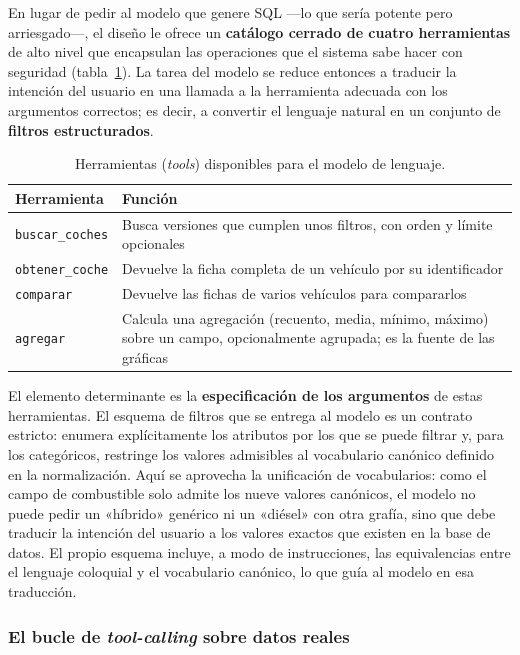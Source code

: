 En lugar de pedir al modelo que genere SQL —lo que sería potente pero
arriesgado—, el diseño le ofrece un \textbf{catálogo cerrado de cuatro
herramientas} de alto nivel que encapsulan las operaciones que el sistema sabe
hacer con seguridad (tabla~\ref{tab:tools}). La tarea del modelo se reduce
entonces a traducir la intención del usuario en una llamada a la herramienta
adecuada con los argumentos correctos; es decir, a convertir el lenguaje natural
en un conjunto de \textbf{filtros estructurados}.

\begin{table}[H]
\centering
\begin{tabular}{p{3.0cm}p{9.5cm}}
\hline
\textbf{Herramienta} & \textbf{Función} \\
\hline
\texttt{buscar\_coches} &
Busca versiones que cumplen unos filtros, con orden y límite opcionales \\
\texttt{obtener\_coche} &
Devuelve la ficha completa de un vehículo por su identificador \\
\texttt{comparar} &
Devuelve las fichas de varios vehículos para compararlos \\
\texttt{agregar} &
Calcula una agregación (recuento, media, mínimo, máximo) sobre un campo,
opcionalmente agrupada; es la fuente de las gráficas \\
\hline
\end{tabular}
\caption{Herramientas (\emph{tools}) disponibles para el modelo de lenguaje.}
\label{tab:tools}
\end{table}

El elemento determinante es la \textbf{especificación de los argumentos} de
estas herramientas. El esquema de filtros que se entrega al modelo es un contrato
estricto: enumera explícitamente los atributos por los que se puede filtrar y,
para los categóricos, restringe los valores admisibles al vocabulario canónico
definido en la normalización. Aquí se aprovecha la unificación de vocabularios:
como el campo de combustible solo admite los nueve valores canónicos, el modelo
no puede pedir un «híbrido» genérico ni un «diésel» con otra grafía, sino que debe
traducir la intención del usuario a los valores exactos que existen en la base de
datos. El propio esquema incluye, a modo de instrucciones, las equivalencias
entre el lenguaje coloquial y el vocabulario canónico, lo que guía al modelo en
esa traducción.

\subsubsection*{El bucle de \emph{tool-calling} sobre datos reales}

